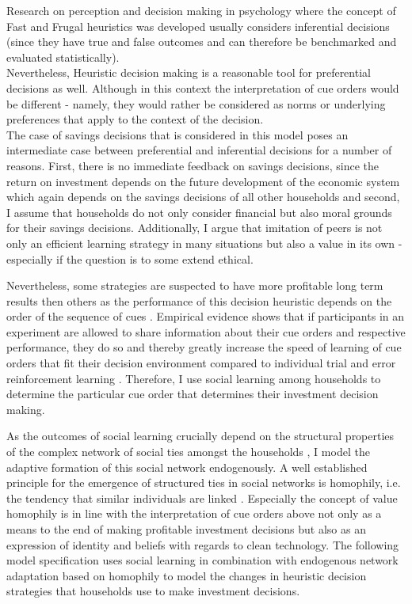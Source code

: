 Research on perception and decision making in psychology where the concept of Fast and Frugal heuristics was developed usually considers inferential decisions (since they have true and false outcomes and can therefore be benchmarked and evaluated statistically).\\
Nevertheless, Heuristic decision making is a reasonable tool for preferential decisions as well. Although in this context the interpretation of cue orders would be different - namely, they would rather be considered as norms or underlying preferences that apply to the context of the decision. \\
The case of savings decisions that is considered in this model poses an intermediate case between preferential and inferential decisions for a number of reasons. First, there is no immediate feedback on savings decisions, since the return on investment depends on the future development of the economic system which again depends on the savings decisions of all other households and second, I assume that households do not only consider financial but also moral grounds for their savings decisions.
Additionally, I argue that imitation of peers is not only an efficient learning strategy in many situations but also a value in its own - especially if the question is to some extend ethical. 

Nevertheless, some strategies are suspected to have more profitable long term results then others as the performance of this decision heuristic depends on the order of the sequence of cues \citep{Gigerenzer2011}. Empirical evidence shows that if participants in an experiment are allowed to share information about their cue orders and respective performance, they do so and thereby greatly increase the speed of learning of cue orders that fit their decision environment compared to individual trial and error reinforcement learning \citep{garcia2009does}. Therefore, I use social learning among households to determine the particular cue order that determines their investment decision making.

As the outcomes of social learning crucially depend on the structural properties of the complex network of social ties amongst the households \citep{Barkoczi2016}, I model the adaptive formation of this social network endogenously.
A well established principle for the emergence of structured ties in social networks is homophily, i.e. the tendency that similar individuals are linked \citep{McPherson2007, Centola2007, Centola2011}. Especially the concept of value homophily \citep{McPherson2007} is in line with the interpretation of cue orders above not only as a means to the end of making profitable investment decisions but also as an expression of identity and beliefs with regards to clean technology.
The following model specification uses social learning in combination with endogenous network adaptation based on homophily to model the changes in heuristic decision strategies that households use to make investment decisions.

